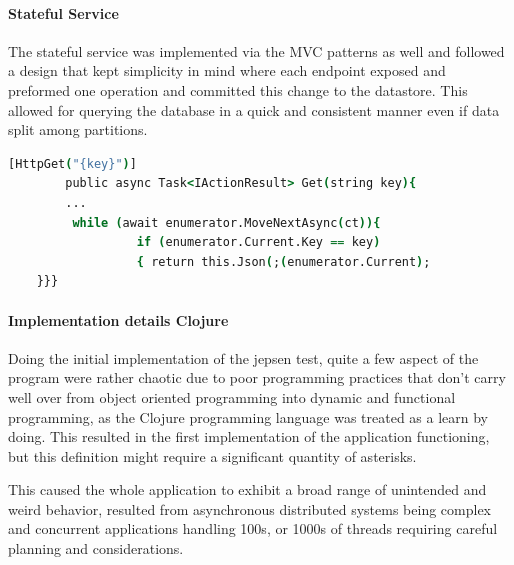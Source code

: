 \documentclass[a4paper,10pt,titlepage]{report}
\begin{document}
\paragraph*{Stateful Service}

The stateful service was implemented via the MVC patterns as well and followed a design that kept simplicity in mind where each endpoint exposed and preformed one operation and committed this change to the datastore. This allowed for querying the database in a quick and consistent manner even if data split among  partitions.
\begin{lstlisting}[language=csh]
        [HttpGet("{key}")]
        public async Task<IActionResult> Get(string key){
        ...
         while (await enumerator.MoveNextAsync(ct)){
                  if (enumerator.Current.Key == key)
                  { return this.Json(;(enumerator.Current);
    }}}
\end{lstlisting}   

\paragraph*{Implementation details Clojure}
 
 Doing the initial implementation of the jepsen test, quite a few aspect of the program were rather chaotic due to poor programming practices that don't carry well over from object oriented  programming into dynamic and functional programming, as the Clojure programming language was treated as a learn by doing. This resulted in the first implementation of the application functioning, but this definition might require a significant quantity of asterisks.
 
 This caused the whole application to exhibit a broad range of unintended and weird behavior, resulted from asynchronous distributed systems being complex and concurrent applications handling 100s, or 1000s of threads requiring careful planning and considerations.
        
\end{document}
